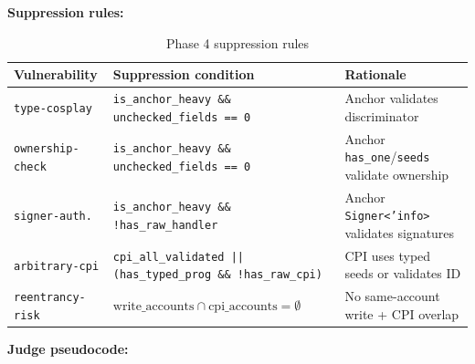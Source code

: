 \documentclass{article}
\begin{document}
\textbf{Suppression rules:}
\vspace{-2pt}
\begin{table}[H]
  \caption{Phase 4 suppression rules}
  \label{tab:suppression}
  \centering
  \small
  \begin{tabular}{p{2.3cm}p{4.8cm}p{4.2cm}}
    \toprule
    Vulnerability & Suppression condition & Rationale \\
    \midrule
    \texttt{type-cosplay} & \texttt{is\_anchor\_heavy \&\& unchecked\_fields == 0} & Anchor validates discriminator \\
    \texttt{ownership-check} & \texttt{is\_anchor\_heavy \&\& unchecked\_fields == 0} & Anchor \texttt{has\_one}/\texttt{seeds} validate ownership \\
    \texttt{signer-auth.} & \texttt{is\_anchor\_heavy \&\& !has\_raw\_handler} & Anchor \texttt{Signer<'info>} validates signatures \\
    \texttt{arbitrary-cpi} & \texttt{cpi\_all\_validated ||} \newline \texttt{(has\_typed\_prog \&\& !has\_raw\_cpi)} & CPI uses typed seeds or validates ID \\
    \texttt{reentrancy-risk} & $\text{write\_accounts} \cap \text{cpi\_accounts} = \emptyset$ & No same-account write + CPI overlap \\
    \bottomrule
  \end{tabular}
\end{table}
\vspace{-4pt}
\textbf{Judge pseudocode:}
\vspace{-2pt}
\end{document}
